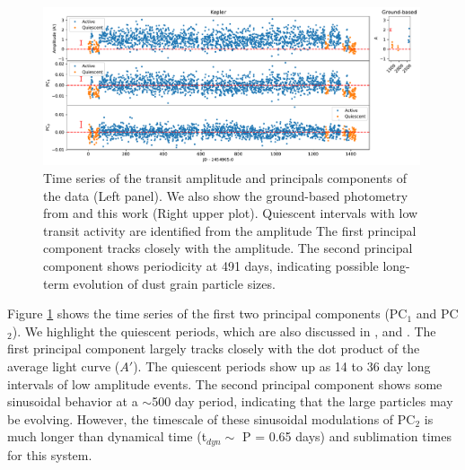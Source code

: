 \documentclass[preprint,trackchanges]{aastex61}
\begin{document}
\begin{figure}[!hbtp]
\begin{centering}
\includegraphics[width=0.99\textwidth]{pc_tser_w_quiescent.pdf}
\caption{Time series of the transit amplitude and principals components of the  data (Left panel).
We also show the ground-based photometry from \citet{schlawin2016kic1255} and this work (Right upper plot).
Quiescent intervals with low transit activity are identified from the amplitude 
The first principal component tracks closely with the amplitude.
The second principal component shows periodicity at 491 days, indicating possible long-term evolution of dust grain particle sizes.
}\label{fig:tserPC}
\end{centering}
\end{figure}

Figure \ref{fig:tserPC} shows the time series of the first two principal components (PC$_1$ and PC$_2$).
We highlight the quiescent periods, which are also discussed in \citet{kawahara2013starspots}, \citet{vanWerkhoven2014} and \citet{croll2015starspots}.
The first principal component largely tracks closely with the dot product of the average light curve ($A'$).
The quiescent periods show up as 14 to 36 day long intervals of low amplitude events.
The second principal component shows some sinusoidal behavior at a $\sim$500 day period, indicating that the large particles may be evolving.
However, the timescale of these sinusoidal modulations of PC$_2$ is much longer than dynamical time (t$_{dyn} \sim$ P = 0.65 days) and sublimation times \citep[$t_{sub} \sim$1 day][]{rappaport} for this system.

\end{document}
